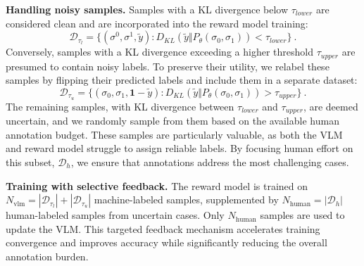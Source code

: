 \noindent \textbf{Handling noisy samples.} Samples with a KL divergence below $\tau_{lower}$ are considered clean and are incorporated into the reward model training: 
\begin{equation} 
\label{D_lower}
    \mathcal{D}_{\tau_{l}} = \{(\sigma^0, \sigma^1, \tilde{y}) : D_{KL}(\tilde{y} \Vert P_\theta(\sigma_0, \sigma_1)) < \tau_{lower}\} \ . 
\end{equation}
%
Conversely, samples with a KL divergence exceeding a higher threshold $\tau_{upper}$ are presumed to contain noisy labels. To preserve their utility, we relabel these samples by flipping their predicted labels and include them in a separate dataset:
\begin{equation}
\label{D_upper}
    \mathcal{D}_{\tau_u} = \{(\sigma_0, \sigma_1, \mathbf{1}-\tilde{y}) : D_{KL}(\tilde{y} \Vert P_\theta(\sigma_0, \sigma_1)) > \tau_{upper}\} \ .
\end{equation}
%
The remaining samples, with KL divergence between $\tau_{lower}$ and $\tau_{upper}$, are deemed uncertain, and we randomly sample from them based on the available human annotation budget. 
These samples are particularly valuable, as both the VLM and reward model struggle to assign reliable labels. 
By focusing human effort on this subset, $\mathcal{D}_{h}$, we ensure that annotations address the most challenging cases. 

\noindent \textbf{Training with selective feedback.} The reward model is trained on $N_{\text{vlm}} = |\mathcal{D}_{\tau_l}| + |\mathcal{D}_{\tau_u}|$ machine-labeled samples, supplemented by $N_{\text{human}}=|\mathcal{D}_h|$ human-labeled samples from uncertain cases. 
Only $N_{\text{human}}$ samples are used to update the VLM. 
This targeted feedback mechanism accelerates training convergence and improves accuracy while significantly reducing the overall annotation burden. 


